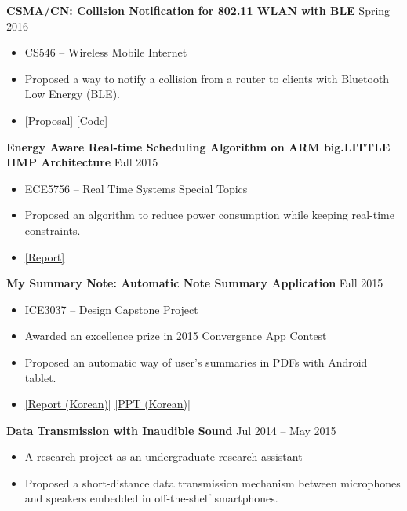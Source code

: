 \documentclass[10pt]{article}
\newenvironment{innerlist}[1][\enskip\textbullet]%
        {\begin{itemize}[#1,leftmargin=*,parsep=0pt,itemsep=0pt,topsep=0pt,partopsep=0pt]}
        {\end{itemize}}
\newcommand{\halfblankline}{\quad\vspace{-0.5\baselineskip}\pagebreak[3]}
\begin{document}
\halfblankline

\textbf{CSMA/CN: Collision Notification for 802.11 WLAN with BLE} \hfill {Spring 2016}
\begin{innerlist}
\item[] CS546 -- Wireless Mobile Internet
\item[] Proposed a way to notify a collision from a router to clients with Bluetooth Low Energy (BLE).
\item[] \href{https://insujang.github.io/assets/pdf/cs546_proposal.pdf}{[Proposal]}
\href{https://github.com/insujang/csmacn}{[Code]}
\end{innerlist}

\halfblankline

\textbf{Energy Aware Real-time Scheduling Algorithm on ARM big.LITTLE HMP Architecture} \hfill {Fall 2015}
\begin{innerlist}
\item[] ECE5756 -- Real Time Systems Special Topics
\item[] Proposed an algorithm to reduce power consumption while keeping real-time constraints.
\item[] \href{https://insujang.github.io/assets/pdf/ece5756_final.pdf}{[Report]}
\end{innerlist}

\halfblankline

\textbf{My Summary Note: Automatic Note Summary Application}
\hfill {Fall 2015}
\begin{innerlist}
\item[] ICE3037 -- Design Capstone Project
\item[] Awarded an excellence prize in 2015 Convergence App Contest
\item[] Proposed an automatic way of user's summaries in PDFs with Android tablet.
\item[] \href{https://insujang.github.io/assets/pdf/ece3037_final.pdf}{[Report (Korean)]}
\href{https://insujang.github.io/assets/pdf/ece3037_final_ppt.pdf}{[PPT (Korean)]}
\end{innerlist}

\halfblankline

\textbf{Data Transmission with Inaudible Sound}
\hfill {Jul 2014 -- May 2015}
\begin{innerlist}
\item[] A research project as an undergraduate research assistant
\item[] Proposed a short-distance data transmission mechanism between microphones
and speakers embedded in off-the-shelf smartphones.
\end{innerlist}
\end{document}
